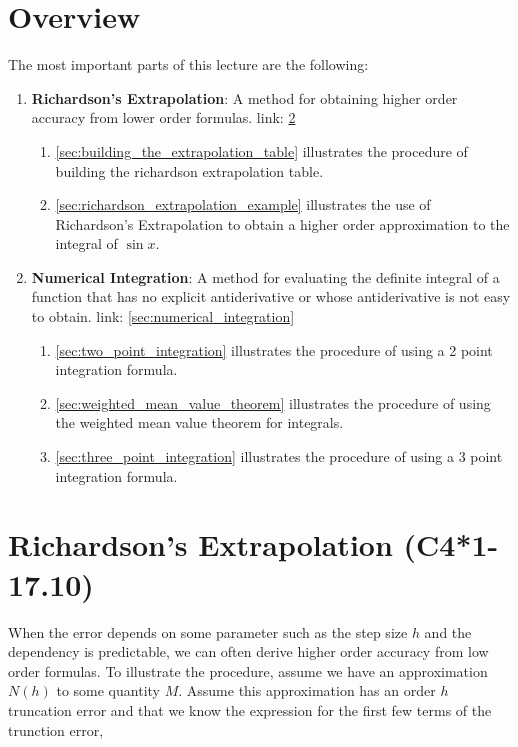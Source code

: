 \section{Overview}

The most important parts of this lecture are the following:

\begin{enumerate}
\item \textbf{Richardson's Extrapolation}: A method for obtaining higher order
  accuracy from lower order formulas. link: \ref{sec:richardson_extrapolation}
  \begin{enumerate}
    \item \ref{sec:building_the_extrapolation_table} illustrates the procedure of
      building the richardson extrapolation table.
    \item \ref{sec:richardson_extrapolation_example} illustrates the use of
      Richardson's Extrapolation to obtain a higher order approximation to the
      integral of $\sin x$.
  \end{enumerate}
\item \textbf{Numerical Integration}: A method for evaluating the definite
  integral of a function that has no explicit antiderivative or whose antiderivative
  is not easy to obtain. link: \ref{sec:numerical_integration}
  \begin{enumerate}
    \item \ref{sec:two_point_integration} illustrates the procedure of using a
      2 point integration formula.
    \item \ref{sec:weighted_mean_value_theorem} illustrates the procedure of
      using the weighted mean value theorem for integrals.
    \item \ref{sec:three_point_integration} illustrates the procedure of using a
      3 point integration formula.
  \end{enumerate}
\end{enumerate}

\pagebreak
\section{Richardson's Extrapolation (C4*1-17.10)}\label{sec:richardson_extrapolation}

When the error depends on some parameter such as the step size $h$ and the
dependency is predictable, we can often derive higher order accuracy from low
order formulas. To illustrate the procedure, assume we have an approximation
$N(h)$ to some quantity $M$. Assume this approximation has an order $h$
truncation error and that we know the expression for the first few terms of the
trunction error,

